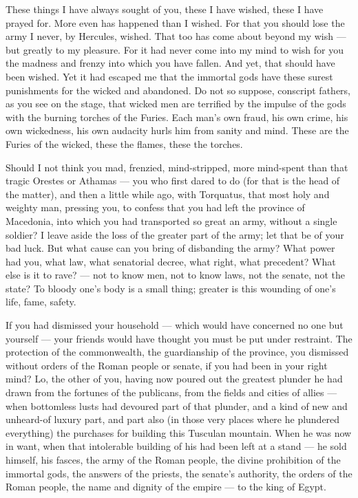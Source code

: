  These things I have always sought of you, these I have wished, these I have prayed for. More even has happened than I wished. For that you should lose the army I never, by Hercules, wished. That too has come about beyond my wish — but greatly to my pleasure. For it had never come into my mind to wish for you the madness and frenzy into which you have fallen. And yet, that should have been wished. Yet it had escaped me that the immortal gods have these surest punishments for the wicked and abandoned. Do not so suppose, conscript fathers, as you see on the stage, that wicked men are terrified by the impulse of the gods with the burning torches of the Furies. Each man's own fraud, his own crime, his own wickedness, his own audacity hurls him from sanity and mind. These are the Furies of the wicked, these the flames, these the torches.

 Should I not think you mad, frenzied, mind-stripped, more mind-spent than that tragic Orestes or Athamas — you who first dared to do (for that is the head of the matter), and then a little while ago, with Torquatus, that most holy and weighty man, pressing you, to confess that you had left the province of Macedonia, into which you had transported so great an army, without a single soldier? I leave aside the loss of the greater part of the army; let that be of your bad luck. But what cause can you bring of disbanding the army? What power had you, what law, what senatorial decree, what right, what precedent? What else is it to rave? — not to know men, not to know laws, not the senate, not the state? To bloody one's body is a small thing; greater is this wounding of one's life, fame, safety.

 If you had dismissed your household — which would have concerned no one but yourself — your friends would have thought you must be put under restraint. The protection of the commonwealth, the guardianship of the province, you dismissed without orders of the Roman people or senate, if you had been in your right mind? Lo, the other of you, having now poured out the greatest plunder he had drawn from the fortunes of the publicans, from the fields and cities of allies — when bottomless lusts had devoured part of that plunder, and a kind of new and unheard-of luxury part, and part also (in those very places where he plundered everything) the purchases for building this Tusculan mountain. When he was now in want, when that intolerable building of his had been left at a stand — he sold himself, his fasces, the army of the Roman people, the divine prohibition of the immortal gods, the answers of the priests, the senate's authority, the orders of the Roman people, the name and dignity of the empire — to the king of Egypt.

